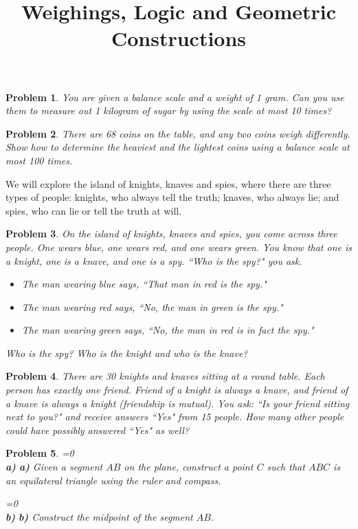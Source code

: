\documentclass[a4paper,12pt]{article}
\title{Weighings, Logic and Geometric Constructions}
\theoremstyle{perfect}
\newtheorem{prb}{Problem}
\newcommand{\varline}{0}
\renewcommand\part[1]{
\ifnum\pdfstrcmp{\varline}{1}=0
    \vspace{.10in}\textbf{\\#1)}
  \else
    \textbf{#1)}
  \fi\renewcommand{\varline}{1}}
\begin{document}
 
\maketitle

\begin{prb}
You are given a balance scale and a weight of 1 gram. Can you use them to measure out 1 kilogram of sugar by using the scale at most 10 times?
\end{prb}

\begin{prb}
There are 68 coins on the table, and any two coins weigh differently. Show how to determine the heaviest and the lightest coins using a balance scale at most 100 times. 
\end{prb}


We will explore the island of knights, knaves and spies, where there are three types of people: knights, who always tell the truth; knaves, who always lie; and spies, who can lie or tell the truth at will.

\begin{prb}
On the island of knights, knaves and spies, you come across three people. One wears blue, one wears red, and one wears green. You know that one is a knight, one is a knave, and one is a spy. 
``Who is the spy?" you ask.

\begin{itemize}
\item The man wearing blue says, ``That man in red is the spy."
\item The man wearing red says, ``No, the man in green is the spy."
\item The man wearing green says, ``No, the man in red is in fact the spy."
\end{itemize}
\noindent
Who is the spy? Who is the knight and who is the knave?
\end{prb}

\begin{prb}
There are 30 knights and knaves sitting at a round table. Each person has exactly one friend. Friend of a knight is always a knave, and friend of a knave is always a knight (friendship is mutual). You ask: ``Is your friend sitting next to you?" and receive answers ``Yes" from 15 people. How many other people could have possibly answered ``Yes" as well?
\end{prb}


\begin{prb}
\part{a} Given a segment $AB$ on the plane, construct a point $C$ such that $ABC$ is an equilateral triangle using the ruler and compass.
\part{b} Construct the midpoint of the segment $AB$. 
\end{prb}
\end{document}
